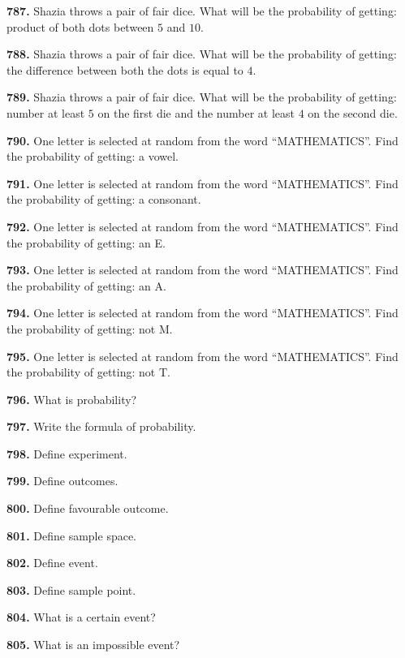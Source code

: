 \documentclass[11pt]{article}
\begin{document}
\bigskip
\noindent\textbf{787.} Shazia throws a pair of fair dice. What will be the probability of getting: product of both dots between $5$ and $10$.

\bigskip
\noindent\textbf{788.} Shazia throws a pair of fair dice. What will be the probability of getting: the difference between both the dots is equal to $4$.

\bigskip
\noindent\textbf{789.} Shazia throws a pair of fair dice. What will be the probability of getting: number at least $5$ on the first die and the number at least $4$ on the second die.

\bigskip
\noindent\textbf{790.} One letter is selected at random from the word ``MATHEMATICS''. Find the probability of getting: a vowel.

\bigskip
\noindent\textbf{791.} One letter is selected at random from the word ``MATHEMATICS''. Find the probability of getting: a consonant.

\bigskip
\noindent\textbf{792.} One letter is selected at random from the word ``MATHEMATICS''. Find the probability of getting: an E.

\bigskip
\noindent\textbf{793.} One letter is selected at random from the word ``MATHEMATICS''. Find the probability of getting: an A.

\bigskip
\noindent\textbf{794.} One letter is selected at random from the word ``MATHEMATICS''. Find the probability of getting: not M.

\bigskip
\noindent\textbf{795.} One letter is selected at random from the word ``MATHEMATICS''. Find the probability of getting: not T.

\bigskip
\noindent\textbf{796.} What is probability?

\bigskip
\noindent\textbf{797.} Write the formula of probability.

\bigskip
\noindent\textbf{798.} Define experiment.

\bigskip
\noindent\textbf{799.} Define outcomes.

\bigskip
\noindent\textbf{800.} Define favourable outcome.

\bigskip
\noindent\textbf{801.} Define sample space.

\bigskip
\noindent\textbf{802.} Define event.

\bigskip
\noindent\textbf{803.} Define sample point.

\bigskip
\noindent\textbf{804.} What is a certain event?

\bigskip
\noindent\textbf{805.} What is an impossible event?
\end{document}

